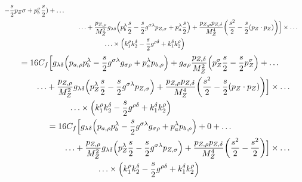 \documentclass[12 pt,draft]{article}
\renewcommand{\b}[1]{\overline{#1}}
\begin{document}
\begin{problem}[ $\mu\b{\mu}\rightarrow f\b{f}$]
\begin{align}
\begin{split}
					-\oo[s]{2}p_{Z}{\sigma}
					+p_{b}^{\sigma}\oo[s]{2}
				)
				+\ldots\\&\qquad\ldots
				+\frac{p_{Z,\rho} }{M_Z^2}g_{\lambda\delta}
				\qty(
					p_{b}^{\lambda}\oo[s]{2}
					-\oo[s]{2}g^{\sigma\lambda}p_{Z,\sigma}
					+p_{a}^{\lambda}\oo[s]{2}
				)
				+\frac{p_{Z,\rho}  p_{Z,\delta} }{M_Z^4}
				\qty(
					\oo[s^2]{2}
					-\oo[s]{2}\qty(p_Z\cdot p_{Z})
					)
				\Big]
				\times\ldots\\&\qquad\qquad\qquad\ldots\times
				\qty(
					k_{1}^{\rho}k_{2}^{\delta}
					-\oo[s]{2}g^{\rho\delta}
					+k_{1}^{\delta}k_{2}^{\rho}
					)
			\end{split}
		\end{align}
		\begin{align}
			\begin{split}
				&=16C_f
				\Big[
				g_{\lambda\delta}
				\qty(
					p_{a,\rho}p_{b}^{\lambda}
					-\oo[s]{2}g^{\sigma\lambda}g_{\sigma\rho}
					+p_{a}^{\lambda}p_{b,\rho}
				)
				+g_{\sigma\rho}\frac{p_{Z,\delta}}{M_Z^2}
				\qty(	
					p_{Z}^{\sigma}\oo[s]{2}
					-\oo[s]{2}p_{Z}^{\sigma}
				)
				+\ldots\\&\qquad\ldots
				+\frac{p_{Z,\rho} }{M_Z^2}g_{\lambda\delta}
				\qty(
					p_{Z}^{\lambda}\oo[s]{2}
					-\oo[s]{2}g^{\sigma\lambda}p_{Z,\sigma}
				)
				+\frac{p_{Z,\rho}  p_{Z,\delta} }{M_Z^4}
				\qty(
					\oo[s^2]{2}
					-\oo[s]{2}\qty(p_Z\cdot p_{Z})
					)
				\Big]
				\times\ldots\\&\qquad\qquad\qquad\ldots\times
				\qty(
					k_{1}^{\rho}k_{2}^{\delta}
					-\oo[s]{2}g^{\rho\delta}
					+k_{1}^{\delta}k_{2}^{\rho}
					)
			\end{split}
			\\
			\begin{split}
				&=16C_f
				\Big[
				g_{\lambda\delta}
				\qty(
					p_{a,\rho}p_{b}^{\lambda}
					-\oo[s]{2}g^{\sigma\lambda}g_{\sigma\rho}
					+p_{a}^{\lambda}p_{b,\rho}
				)
				+0
				+\ldots\\&\qquad\ldots
				+\frac{p_{Z,\rho} }{M_Z^2}g_{\lambda\delta}
				\qty(
					p_{Z}^{\lambda}\oo[s]{2}
					-\oo[s]{2}g^{\sigma\lambda}p_{Z,\sigma}
				)
				+\frac{p_{Z,\rho}  p_{Z,\delta} }{M_Z^4}
				\qty(
					\oo[s^2]{2}
					-\oo[s^2]{2}
					)
				\Big]
				\times\ldots\\&\qquad\qquad\qquad\ldots\times
				\qty(
					k_{1}^{\rho}k_{2}^{\delta}
					-\oo[s]{2}g^{\rho\delta}
					+k_{1}^{\delta}k_{2}^{\rho}
					)
			\end{split}
			\\

\end{align}
\end{problem}
\end{document}
